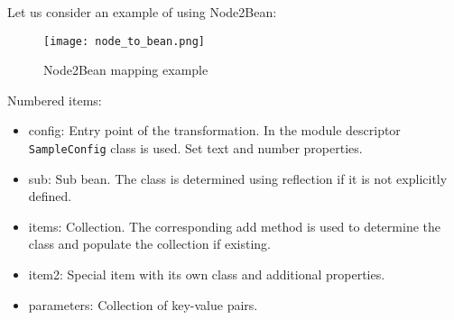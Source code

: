 Let us consider an example of using Node2Bean:

\begin{figure}[H]
	\centering
	\texttt{[image: node\_to\_bean.png]}
	\caption{Node2Bean mapping example}
	\label{fig:node2bean}
\end{figure}

Numbered items:

\begin{itemize}
  \item config: Entry point of the transformation. In the module descriptor
  \texttt{SampleConfig} class is used. Set text and number properties.
  \item sub: Sub bean. The class is determined using reflection if it is not
  explicitly defined.
  \item items: Collection. The corresponding add method is used to determine the
  class and populate the collection if existing.
  \item item2: Special item with its own class and additional properties.
  \item parameters: Collection of key-value pairs.
\end{itemize}
